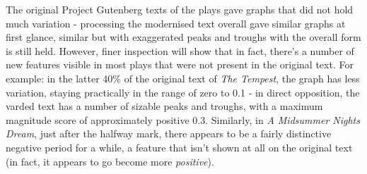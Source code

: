 \documentclass{article}
\begin{document}
        The original Project Gutenberg texts of the plays gave graphs that did not hold much variation - processing the modernised text overall gave similar graphs at first glance, similar but with exaggerated peaks and troughs with the overall form is still held. However, finer inspection will show that in fact, there's a number of new features visible in most plays that were not present in the original text. For example: in the latter 40\% of the original text of \textit{The Tempest}, the graph has less variation, staying practically in the range of zero to 0.1 - in direct opposition, the varded text has a number of sizable peaks and troughs, with a maximum magnitude score of approximately positive 0.3. Similarly, in \textit{A Midsummer Nights Dream}, just after the halfway mark, there appears to be a fairly distinctive negative period for a while, a feature that isn't shown at all on the original text (in fact, it appears to go become more \textit{positive}).
\end{document}
